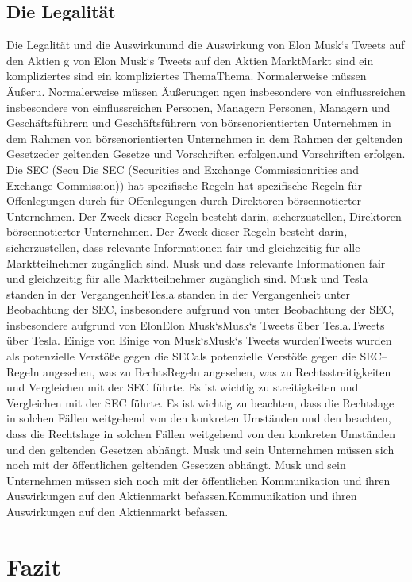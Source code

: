 \documentclass{article}
\begin{document}
\subsection{Die Legalität}
Die Legalität und die Auswirkunund die Auswirkung von Elon Musk`s Tweets auf den Aktien g von Elon Musk`s Tweets auf den Aktien MarktMarkt sind ein kompliziertes sind ein kompliziertes ThemaThema. Normalerweise müssen Äußeru. Normalerweise müssen Äußerungen ngen insbesondere von einflussreichen insbesondere von einflussreichen Personen, Managern Personen, Managern und Geschäftsführern und Geschäftsführern von börsenorientierten Unternehmen in dem Rahmen von börsenorientierten Unternehmen in dem Rahmen der geltenden Gesetzeder geltenden Gesetze und Vorschriften erfolgen.und Vorschriften erfolgen.
Die SEC (Secu
Die SEC (Securities and Exchange Commissionrities and Exchange Commission)) hat spezifische Regeln hat spezifische Regeln für Offenlegungen durch für Offenlegungen durch Direktoren börsennotierter Unternehmen. Der Zweck dieser Regeln besteht darin, sicherzustellen, Direktoren börsennotierter Unternehmen. Der Zweck dieser Regeln besteht darin, sicherzustellen, dass relevante Informationen fair und gleichzeitig für alle Marktteilnehmer zugänglich sind. Musk und dass relevante Informationen fair und gleichzeitig für alle Marktteilnehmer zugänglich sind. Musk und Tesla standen in der VergangenheitTesla standen in der Vergangenheit unter Beobachtung der SEC, insbesondere aufgrund von unter Beobachtung der SEC, insbesondere aufgrund von ElonElon Musk`sMusk`s Tweets über Tesla.Tweets über Tesla. Einige von Einige von Musk`sMusk`s Tweets wurdenTweets wurden als potenzielle Verstöße gegen die SECals potenzielle Verstöße gegen die SEC--Regeln angesehen, was zu RechtsRegeln angesehen, was zu Rechtsstreitigkeiten und Vergleichen mit der SEC führte. Es ist wichtig zu streitigkeiten und Vergleichen mit der SEC führte. Es ist wichtig zu beachten, dass die Rechtslage in solchen Fällen weitgehend von den konkreten Umständen und den beachten, dass die Rechtslage in solchen Fällen weitgehend von den konkreten Umständen und den geltenden Gesetzen abhängt. Musk und sein Unternehmen müssen sich noch mit der öffentlichen geltenden Gesetzen abhängt. Musk und sein Unternehmen müssen sich noch mit der öffentlichen Kommunikation und ihren Auswirkungen auf den Aktienmarkt befassen.Kommunikation und ihren Auswirkungen auf den Aktienmarkt befassen.

\section{Fazit}
\end{document}
